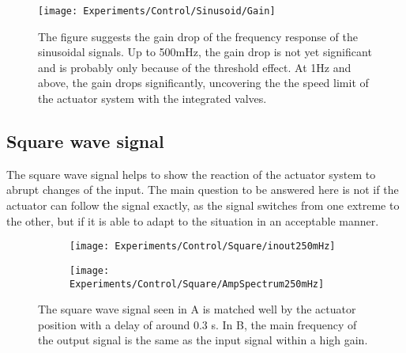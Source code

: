 \documentclass[main]{subfiles}
\begin{document}
\begin{figure}[H]
\centering
\texttt{[image: Experiments/Control/Sinusoid/Gain]}
\caption[Gain drop in frequency response of sinusoidal signals]{The figure suggests the gain drop of the frequency response of the sinusoidal signals. Up to 500mHz, the gain drop is not yet significant and is probably only because of the threshold effect. At 1Hz and above, the gain drops significantly, uncovering the the speed limit of the actuator system with the integrated valves.}
\label{sin-gain}
\end{figure}

\newpage
\subsection{Square wave signal}

The square wave signal helps to show the reaction of the actuator system to abrupt changes of the input. The main question to be answered here is not if the actuator can follow the signal exactly, as the signal switches from one extreme to the other, but if it is able to adapt to the situation in an acceptable manner.
\begin{figure}[H]
\begin{adjustwidth}{-8em}{-3em}
\begin{subfigure}[t]{0.665\textwidth}
\texttt{[image: Experiments/Control/Square/inout250mHz]}
\end{subfigure}\hspace{0.05\textwidth}
\begin{subfigure}[t]{0.6\textwidth}
\texttt{[image: Experiments/Control/Square/AmpSpectrum250mHz]}
\end{subfigure}
\end{adjustwidth}
\caption[Square wave control signal at 250mHz]{The square wave signal seen in A is matched well by the actuator position with a delay of around 0.3 s. In B, the main frequency of the output signal is the same as the input signal within a high gain.}
\label{sq-250mHz}
\end{figure}
\end{document}
